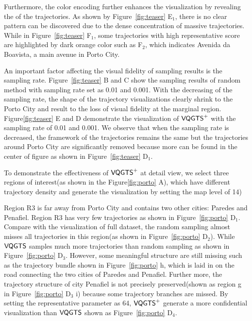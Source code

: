 Furthermore, the color encoding further enhances the visualization by revealing the  of the trajectories.
As shown by Figure~\ref{fig:teaser} E$_1$, there is no clear pattern can be discovered due to the dense concentration of massive trajectories. While in Figure~\ref{fig:teaser} F$_1$, some trajectories with high representative score are highlighted by dark orange color such as F$_2$, which indicates Avenida da Boavista, a main avenue in Porto City. 
 
 
An important factor affecting the visual fidelity of sampling results is the sampling rate. Figure~\ref{fig:teaser} B and C show the sampling results of random method with sampling rate set as 0.01 and 0.001. With the decreasing of the sampling rate, the shape of the trajectory visualizations clearly shrink to the Porto City and result to the loss of visual fidelity at the marginal region. Figure\ref{fig:teaser} E and D demonstrate the visualization of $\mathsf{VQGTS}^{+}$ with the sampling rate of 0.01 and 0.001. We observe that when the sampling rate is decreased, the framework of the trajectories remains the same but the trajectories around Porto City are significantly removed because more  can be found in the center of figure as shown in Figure~\ref{fig:teaser} D$_1$. 

To demonstrate the effectiveness of $\mathsf{VQGTS}^{+}$ at detail view, we select three regions of interest(as shown in the Figure\ref{fig:porto} A), which have different trajectory density and generate the visualization by setting the map level of 14) 
   
Region R3 is far away from Porto City and contains two other cities: Paredes and Penafiel. Region R3 has very few trajectories as shown in Figure~\ref{fig:porto} D$_1$.  Compare with the visualization of full dataset, the random sampling almost misses all trajectories in this region(as shown in Figure~\ref{fig:porto} D$_2$). While $\mathsf{VQGTS}$ samples much more trajectories than random sampling as shown in Figure~\ref{fig:porto} D$_3$. However, some meaningful structure are still missing such as the trajectory bundle shown in Figure~\ref{fig:porto} h, which is laid in on the road  connecting the two cities of Paredes and Penafiel. Further more, the trajectory structure of city Penafiel is not precisely preserved(shown as region g in Figure~\ref{fig:porto} D$_3$ i) because some  trajectory branches are missed.  
By setting the representative parameter as 64, $\mathsf{VQGTS}^{+}$ generate a more confidential visualization than $\mathsf{VQGTS}$ shown as Figure~\ref{fig:porto} D$_4$. 

